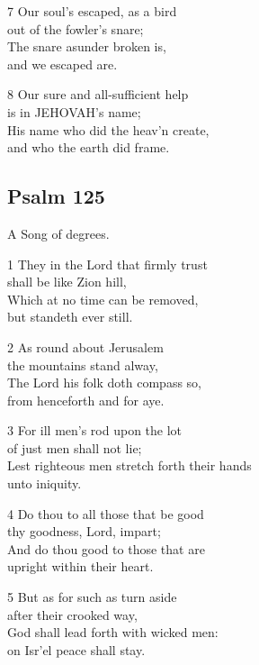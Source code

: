 7 Our soul’s escaped, as a bird\\
out of the fowler’s snare;\\
The snare asunder broken is,\\
and we escaped are.

8 Our sure and all-sufficient help\\
is in JEHOVAH’s name;\\
His name who did the heav’n create,\\
and who the earth did frame.

\begin{center}
\quad{}\quad{}
\end{center}

\subsection*{Psalm 125}

A Song of degrees.

1 They in the Lord that firmly trust\\
shall be like Zion hill,\\
Which at no time can be removed,\\
but standeth ever still.

2 As round about Jerusalem\\
the mountains stand alway,\\
The Lord his folk doth compass so,\\
from henceforth and for aye.

3 For ill men’s rod upon the lot\\
of just men shall not lie;\\
Lest righteous men stretch forth their hands\\
unto iniquity.

4 Do thou to all those that be good\\
thy goodness, Lord, impart;\\
And do thou good to those that are\\
upright within their heart.

5 But as for such as turn aside\\
after their crooked way,\\
God shall lead forth with wicked men:\\
on Isr’el peace shall stay.

\begin{center}
\quad{}\quad{}
\end{center}

